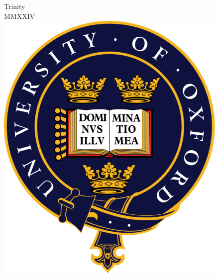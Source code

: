 \documentclass[11pt,a4paper]{report}
\begin{document}
\begin{titlepage}
\vfill 
\begin{figure}[b]
\centering
{\large \color{white} Trinity \\MMXXIV}\\[1cm]
\includegraphics[scale=0.15]{Images/Oxford_Logo.png}
\end{figure}
\end{titlepage}
\pagecolor{white}    

\newpage
{\pagestyle{plain}


}

{
\begin{singlespace}
\pagestyle{plain}
\begingroup
\hypersetup{linkcolor=black}
\tableofcontents
\endgroup

{
\cleardoublepage
\vspace*{-2\baselineskip}
\printnoidxglossary[style=mcolindex,type=acronym,title=Abbreviations]
}
\end{singlespace}
}

\newpage
{}

\end{document}
